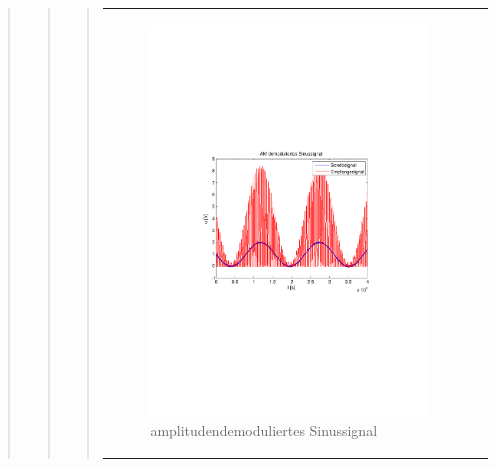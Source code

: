 \begin{quote}
\begin{quote}
\begin{quote}
                \begin{center}
                \begin{tabular}{ll}
    
                \hspace{-14em}
                    \begin{minipage}{0.6\textwidth}
    
                        \begin{figure}[H]
                            \label{fig:}
                            \includegraphics[scale=0.5, trim = 2cm 6.5cm 1.5cm
                            8.5cm, clip]{./Bilder/synchDemod_sinus} %
                            \caption{amplitudendemoduliertes Sinussignal}
                        \end{figure}
    

\end{minipage}
\end{tabular}
\end{center}
\end{quote}
\end{quote}
\end{quote}
